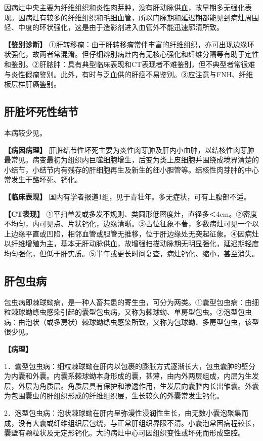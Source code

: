 因病灶中央主要为纤维组织和炎性肉芽肿，没有肝动脉供血，故早期多无强化表现。因病灶有较多的纤维组织和毛细血管，所以门脉期和延迟期都能见到病灶周围轻、中度的环状强化，这是由于造影剂进入血管外不能迅速廓清所致。

\textbf{【鉴别诊断】}
①肝转移瘤：由于肝转移瘤常伴丰富的纤维组织，亦可出现边缘环状强化，故两者常混淆。但仔细辨别病灶内有无核心强化和纤维分隔等有助于定性和鉴别。②肝脓肿：具有典型临床表现和CT表现者不难鉴别，但不典型者常很难与炎性假瘤鉴别。此外，有时与乏血供的肝癌不易鉴别。③应注意与FNH、纤维板层样肝癌鉴别。

\subsection{肝脏坏死性结节}

本病较少见。

\textbf{【病因病理】}
肝脏结节性坏死主要为炎性肉芽肿及肝内小血肿，以结核性肉芽肿最常见。病变最初为组织内巨噬细胞增生，后变为类上皮细胞并围绕成境界清楚的小结节，小结节内有残存的肝细胞再生及新生的细小胆管等。结核性肉芽肿的中心常发生干酪坏死、钙化。

\textbf{【临床表现】}
国内有学者报道1组，见于青壮年。多无症状，可有上腹部不适。

\textbf{【CT表现】}
①平扫单发或多发不规则、类圆形低密度灶，直径多＜4cm。②密度不均匀，内可见点、片状钙化，边缘清晰。③占位征象不著，多数病灶可见一个以上边缘平直或凹陷，相邻血管或胆管无推移，位于肝边缘处无突起征象。④因病灶以纤维增殖为主，基本无肝动脉供血，故增强扫描动脉期无明显强化，延迟期轻度均匀强化，但低于肝实质。⑤半年或更长时间复查，病灶钙化、缩小，甚至消失。

\subsection{肝包虫病}

包虫病即棘球蚴病，是一种人畜共患的寄生虫，可分为两类。①囊型包虫病：由细粒棘球蚴绦虫感染引起的囊型包虫病，又称为棘球蚴、单房型包虫。②泡型包虫病：由泡状（或多房状）棘球蚴绦虫感染所致，又称为包球蚴、多房型包虫，该型很少见。

\textbf{【病理】}

1．囊型包虫病：细粒棘球蚴在肝内以包裹的膨胀方式逐渐长大，包虫囊肿的壁分为内囊和外囊。内囊系棘球蚴本身形成的囊，甚薄，由内外两层组成，内层为生发层，外层为角质层。角质层具有保护和渗透作用，生发层向囊腔内长出雏囊。外囊为包围囊虫的肝组织形成的纤维组织层，生长较久的外囊常发生钙化。

2．泡型包虫病：泡状棘球蚴在肝内呈弥漫性浸润性生长，由无数小囊泡聚集而成，没有大囊或纤维组织层包绕，与正常肝组织界限不清。小囊泡常因病程较长，囊壁有颗粒状及无定形钙化。大的病灶中心可因组织变性或坏死而形成空腔。

